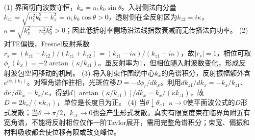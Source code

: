 (1) 界面切向波数守恒，\(k_x=n_1k_0\sin\theta\)。入射侧法向分量\(k_{z1}=\sqrt{n_1^2k_0^2-k_x^2}=n_1k_0\cos\theta>0\)，透射侧在全反射区为\(k_{z2}=i\kappa\)，\(\kappa=\sqrt{k_x^2-n_2^2k_0^2}>0\)；因此低折射率侧场沿法线指数衰减而无传播法向功率。
(2) 对TE偏振，Fresnel反射系数\(r_s=(k_{z1}-k_{z2})/(k_{z1}+k_{z2})=(k_{z1}-i\kappa)/(k_{z1}+i\kappa)\)，故\(|r_s|=1\)，相位可取\(\phi_r(k_x)=-2\arctan(\kappa/k_{z1})\)。虽反射率为1，但相位随入射波数变化，形成反射波包空间移动的机制。
(3) 将入射束作围绕中心\(k_x\)的角谱积分，反射振幅额外含\(e^{i\phi_r(k_x)}\)。对窄角谱作驻相，光斑位移\(D=-d\phi_r/dk_x\)。利用\(dk_{z1}/dk_x=-k_x/k_{z1}\)、\(d\kappa/dk_x=k_x/\kappa\)，得到\(d[\arctan(\kappa/k_{z1})]/dk_x=k_x/(\kappa k_{z1})\)，故\(D=2k_x/(\kappa k_{z1})\)，单位是长度且为正。
(4) 当\(\theta\downarrow\theta_c\)，\(\kappa\to0\)使平面波公式的\(D\)形式发散；当\(\theta\to\pi/2\)，\(k_{z1}\to0\)也会产生形式发散。真实有限宽度束在临界角附近有宽角谱，不能将反射相位仅作一阶Taylor展开，需用完整角谱积分；束宽、偏振和材料吸收都会使位移有限或改变峰位。
